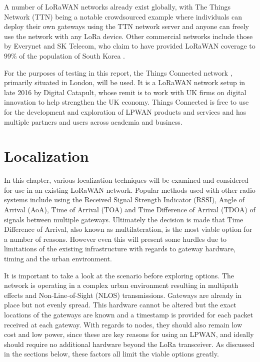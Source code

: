 \documentclass[a4paper]{report}
\begin{document}
    A number of LoRaWAN networks already exist globally, with The Things Network (TTN) being a notable crowdsourced example where individuals can deploy their own gateways using the TTN network server and anyone can freely use the network with any LoRa device. Other commercial networks include those by Everynet and SK Telecom, who claim to have provided LoRaWAN coverage to 99\% of the population of South Korea \cite{Bicheno2016}.

    For the purposes of testing in this report, the Things Connected network \cite{ThingsConnected}, primarily situated in London, will be used. It is a LoRaWAN network setup  in late 2016 by Digital Catapult, whose remit is to work with UK firms on digital innovation to help strengthen the UK economy. Things Connected is free to use for the development and exploration of LPWAN products and services and has multiple partners and users across academia and business.



\chapter{Localization}

  In this chapter, various localization techniques will be examined and considered for use in an existing LoRaWAN network. Popular methods used with other radio systems include using the Received Signal Strength Indicator (RSSI), Angle of Arrival (AoA), Time of Arrival (TOA) and Time Difference of Arrival (TDOA) of signals between multiple gateways. Ultimately the decision is made that Time Difference of Arrival, also known as multilateration, is the most viable option for a number of reasons. However even this will present some hurdles due to limitations of the existing infrastructure with regards to gateway hardware, timing and the urban environment.

  It is important to take a look at the scenario before exploring options. The network is operating in a complex urban environment resulting in multipath effects and Non-Line-of-Sight (NLOS) transmissions. Gateways are already in place but not evenly spread. This hardware cannot be altered but the exact locations of the gateways are known and a timestamp is provided for each packet received at each gateway. With regards to nodes, they should also remain low cost and low power, since these are key reasons for using an LPWAN, and ideally should require no additional hardware beyond the LoRa transceiver. As discussed in the sections below, these factors all limit the viable options greatly.
\end{document}
